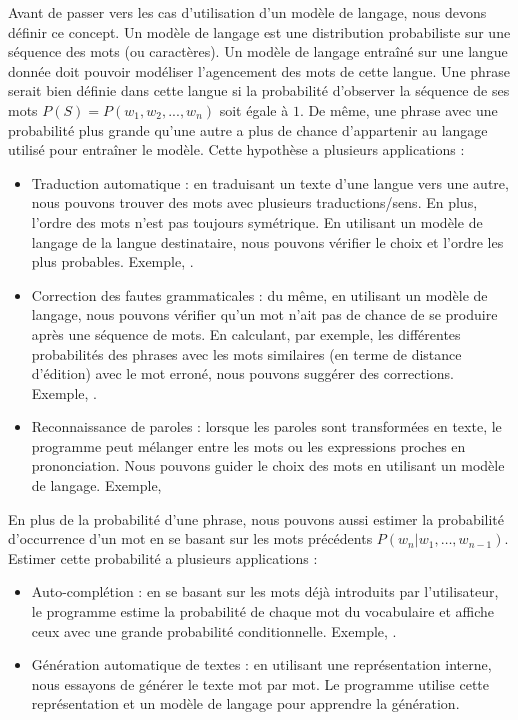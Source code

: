 \documentclass{KodeBook}
\begin{document}
Avant de passer vers les cas d'utilisation d'un modèle de langage, nous devons définir ce concept.
Un modèle de langage est une distribution probabiliste sur une séquence des mots (ou caractères).
Un modèle de langage entraîné sur une langue donnée doit pouvoir modéliser l'agencement des mots de cette langue.
Une phrase serait bien définie dans cette langue si la probabilité d'observer la séquence de ses mots $P(S) = P(w_1, w_2, ..., w_n) $ soit égale à $1$. 
De même, une phrase avec une probabilité plus grande qu'une autre a plus de chance d'appartenir au langage utilisé pour entraîner le modèle.
Cette hypothèse a plusieurs applications : 
\begin{itemize}
	\item Traduction automatique : en traduisant un texte d'une langue vers une autre, nous pouvons trouver des mots avec plusieurs traductions/sens. 
	En plus, l'ordre des mots n'est pas toujours symétrique. 
	En utilisant un modèle de langage de la langue destinataire, nous pouvons vérifier le choix et l'ordre les plus probables. 
	Exemple, 
	.
	
	\item Correction des fautes grammaticales : du même, en utilisant un modèle de langage, nous pouvons vérifier qu'un mot n'ait pas de chance de se produire après une séquence de mots. 
	En calculant, par exemple, les différentes probabilités des phrases avec les mots similaires (en terme de distance d'édition) avec le mot erroné, nous pouvons suggérer des corrections.
	Exemple, .
	
	\item Reconnaissance de paroles : lorsque les paroles sont transformées en texte, le programme peut mélanger entre les mots ou les expressions proches en prononciation. 
	Nous pouvons guider le choix des mots en utilisant un modèle de langage.
	Exemple, 
\end{itemize}
%
En plus de la probabilité d'une phrase, nous pouvons aussi estimer la probabilité d'occurrence d'un mot en se basant sur les mots précédents $P(w_n | w_1, \ldots, w_{n-1}) $. 
Estimer cette probabilité a plusieurs applications :
\begin{itemize}
	\item Auto-complétion : en se basant sur les mots déjà introduits par l'utilisateur, le programme estime la probabilité de chaque mot du vocabulaire et affiche ceux avec une grande probabilité conditionnelle.
	Exemple, .
	
	\item Génération automatique de textes : en utilisant une représentation interne, nous essayons de générer le texte mot par mot. 
	Le programme utilise cette représentation et un modèle de langage pour apprendre la génération.
\end{itemize}
\end{document}
